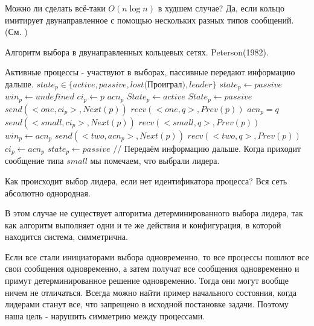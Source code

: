 Можно ли сделать всё-таки $O(n\log n)$ в худшем случае? Да, если кольцо имитирует двунаправленное с помощью нескольких разных типов сообщений. (См. )
\begin{algorithm}
	\caption{Алгоритм выбора в двунаправленных кольцевых сетях. Peterson(1982).}
	\label{algPeterson}
	\begin{algorithmic}
		\State Активные процессы - участвуют в выборах, пассивные передают информацию дальше. 
		\State $state_p \in \{active, passive, lost\text{(Проиграл)}, leader\}$ 
		\State $state_p \gets passive$
		\State $win_p \gets undefined$ 
		\State $ci_p \gets p$ 
		\State $acn_p$ 
		\State $State_p \gets active$
		\Else 
		\State $State_p \gets passive$
		\EndIf
		\State $send(<one, ci_p>, Next(p))$ 
		\State $recv(<one, q>, Prev(p))$
		\State $acn_p = q$
		 
		\State $send(<small, ci_p>, Next(p))$ 
		\State $recv(<small, q>, Prev(p))$ 
		\State $win_p \gets acn_p$
		\Else {}
		\State $send(<two, acn_p>, Next(p))$
		\State $recv(<two, q>, Prev(p))$
		 
		\State $ci_p \gets acn_p$
		\Else 
		\State $state_p \gets passive$ 
		\EndIf
		\EndIf
		\EndWhile
		\State // Передаём информацию дальше.
		\EndIf
		\State Когда приходит сообщение типа $small$ мы помечаем, что выбрали лидера.
	\end{algorithmic}
\end{algorithm}

Как происходит выбор лидера, если нет идентификатора процесса? Вся сеть абсолютно однородная.

В этом случае не существует алгоритма детерминированного выбора лидера, так как алгоритм выполняет одни и те же действия и конфигурация, в которой находится система, симметрична.

Если все стали инициаторами выбора одновременно, то все процессы пошлют все свои сообщения одновременно, а затем получат все сообщения одновременно и примут детерминированное решение одновременно. Тогда они могут вообще ничем не отличаться. Всегда можно найти пример начального состояния, когда лидерами станут все, что запрещено в исходной постановке задачи. Поэтому наша цель - нарушить симметрию между процессами.

